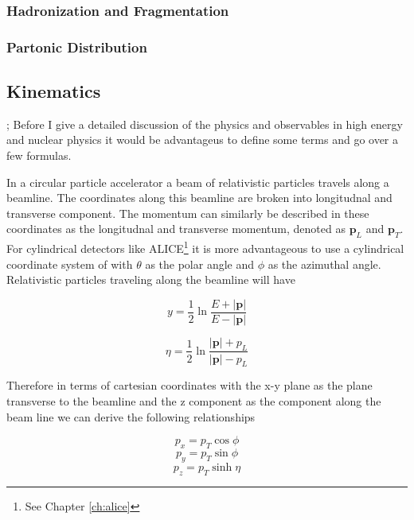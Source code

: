 \subsubsection{Hadronization and Fragmentation}

\subsubsection{Partonic Distribution}


\subsection{Kinematics}\label{sec:kinematics};
Before I give a detailed discussion of the physics and observables in high energy and nuclear physics it would be advantageus to define some terms and go over a few formulas.

In a circular particle accelerator a beam of relativistic particles travels along a beamline.  The coordinates along this beamline are broken into longitudnal and transverse component. The momentum can similarly be described in these coordinates as the longitudnal and transverse momentum, denoted as $\mathbf{p}_{L}$ and $\mathbf{p}_{T}$.  For cylindrical detectors like ALICE\footnote{See Chapter \ref{ch:alice}} it is more advantageous to use a cylindrical coordinate system of with $\theta$ as the polar angle and $\phi$ as the azimuthal angle.  Relativistic particles traveling along the beamline will have 

\begin{equation}
\textit{y} = \frac{1}{2} \ln \frac{E + |\mathbf{p}|}{E - |\mathbf{p}|}
\label{eq:rapidity}
\end{equation}

\begin{equation}
\eta = \frac{1}{2} \ln \frac{|\mathbf{p}| + p_{L}}{|\mathbf{p}| - p_{L}}
\label{eq:psuedo}
\end{equation}

\noindent
Therefore in terms of cartesian coordinates with the x-y plane as the plane transverse to the beamline and the z component as the component along the beam line we can derive the following relationships

\begin{equation}
p_{x} = p_{T} \cos \phi
\label{eq:xcomp}
\end{equation}
\begin{equation}
p_{y} = p_{T} \sin \phi
\label{eq:ycomp}
\end{equation}
\begin{equation}
p_{z} = p_{T} \sinh \eta
\label{eq:zcomp}
\end{equation}

